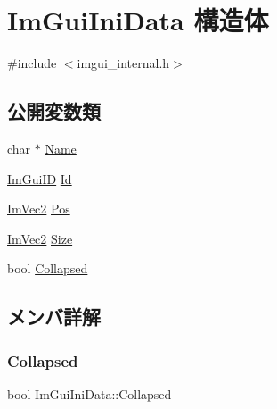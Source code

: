 \hypertarget{struct_im_gui_ini_data}{}\section{Im\+Gui\+Ini\+Data 構造体}
\label{struct_im_gui_ini_data}


{\ttfamily \#include $<$imgui\+\_\+internal.\+h$>$}

\subsection*{公開変数類}
\begin{DoxyCompactItemize}
\item 
char $\ast$ \mbox{\hyperlink{struct_im_gui_ini_data_aef4db96cc7332d492bba873028a00f66}{Name}}
\item 
\mbox{\hyperlink{imgui_8h_a1785c9b6f4e16406764a85f32582236f}{Im\+Gui\+ID}} \mbox{\hyperlink{struct_im_gui_ini_data_a8c3cd42549a5f432199d1a66e0133d80}{Id}}
\item 
\mbox{\hyperlink{struct_im_vec2}{Im\+Vec2}} \mbox{\hyperlink{struct_im_gui_ini_data_a8598c0d937901fc22f808f11f9aa6bac}{Pos}}
\item 
\mbox{\hyperlink{struct_im_vec2}{Im\+Vec2}} \mbox{\hyperlink{struct_im_gui_ini_data_af3d56b3e89c45d07d7927ab95dbd86fa}{Size}}
\item 
bool \mbox{\hyperlink{struct_im_gui_ini_data_a299660ea0cab78a8cbefa02314c8cf47}{Collapsed}}
\end{DoxyCompactItemize}


\subsection{メンバ詳解}
\mbox{\label{struct_im_gui_ini_data_a299660ea0cab78a8cbefa02314c8cf47}} 
\subsubsection{\texorpdfstring{Collapsed}{Collapsed}}
{\footnotesize\ttfamily bool Im\+Gui\+Ini\+Data\+::\+Collapsed}

\mbox{\label{struct_im_gui_ini_data_a8c3cd42549a5f432199d1a66e0133d80}} 
